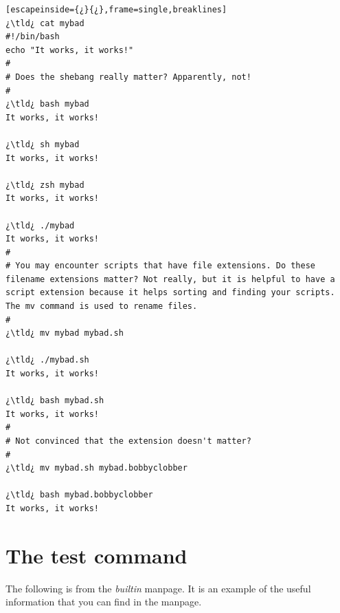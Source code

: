 \begin{lstlisting}[escapeinside={¿}{¿},frame=single,breaklines]
¿\tld¿ cat mybad
#!/bin/bash
echo "It works, it works!"
#
# Does the shebang really matter? Apparently, not!
#
¿\tld¿ bash mybad
It works, it works!

¿\tld¿ sh mybad
It works, it works!

¿\tld¿ zsh mybad
It works, it works!

¿\tld¿ ./mybad
It works, it works!
#
# You may encounter scripts that have file extensions. Do these filename extensions matter? Not really, but it is helpful to have a script extension because it helps sorting and finding your scripts. The mv command is used to rename files.
#
¿\tld¿ mv mybad mybad.sh

¿\tld¿ ./mybad.sh
It works, it works!

¿\tld¿ bash mybad.sh
It works, it works!
#
# Not convinced that the extension doesn't matter?
#
¿\tld¿ mv mybad.sh mybad.bobbyclobber

¿\tld¿ bash mybad.bobbyclobber 
It works, it works!
\end{lstlisting}

\section{The test command}

The following is from the \emph{builtin} manpage. It is an example of the useful information that you can find in the manpage.

